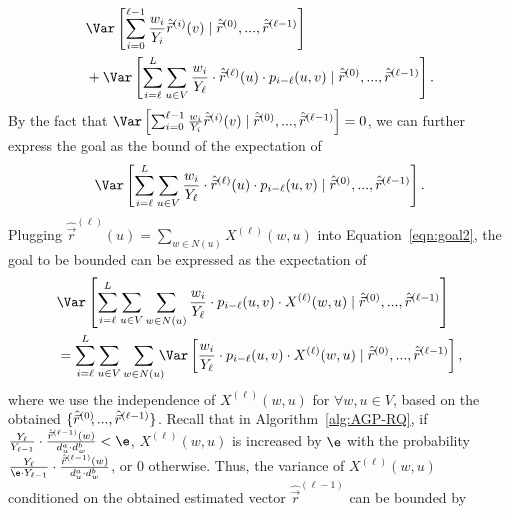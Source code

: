 \vspace{-2mm}
\begin{equation}\nonumber
\vspace{-2mm}
\begin{aligned}
&\Var \left[\sum_{i=0}^{\ell-1} \frac{w_i}{Y_i}\hat{\vec{r}}^{(i)}(v)\mid  \hat{\vec{r}}^{(0)},...,\hat{\vec{r}}^{(\ell-1)}\right]\\
&+\Var \left[\sum_{i=\ell}^{L}\sum_{u \in V} \frac{w_i}{Y_{\ell}}\cdot  \hat{\vec{r}}^{(\ell)}(u)\cdot  p_{i-\ell}(u,v)\mid  \hat{\vec{r}}^{(0)},...,\hat{\vec{r}}^{(\ell-1)}\right]. 
\end{aligned}
\end{equation}
By the fact that $\Var \left[ \sum_{i=0}^{\ell-1}\frac{w_i}{Y_i}\hat{\vec{r}}^{(i)}(v)\mid \hat{\vec{r}}^{(0)},...,\hat{\vec{r}}^{(\ell-1)}\right]=0$, we can further express the goal as the bound of the expectation of 
\vspace{-2mm}
\begin{equation}\label{eqn:goal2}
\vspace{-2mm}
\Var \left[\sum_{i=\ell}^{L}\sum_{u \in V} \frac{w_i}{Y_{\ell}}\cdot  \hat{\vec{r}}^{(\ell)}(u)\cdot  p_{i-\ell}(u,v)\mid  \hat{\vec{r}}^{(0)},...,\hat{\vec{r}}^{(\ell-1)}\right]. 
\end{equation}
Plugging $\hat{\vec{r}}^{(\ell)}(u)=\sum_{w \in N(u)} X^{(\ell)}(w,u)$ into Equation~\eqref{eqn:goal2}, the goal to be bounded can be expressed as the expectation of
\vspace{-1mm}
\begin{equation}\label{eqn:goal3}
\begin{aligned}
&\Var \left[\sum_{i=\ell}^{L}\sum_{u \in V} \sum_{w \in N(u)}\frac{w_i}{Y_{\ell}}\cdot p_{i-\ell}(u,v) \cdot X^{(\ell)}(w,u)\mid  \hat{\vec{r}}^{(0)},...,\hat{\vec{r}}^{(\ell-1)}\right]\\
&=\sum_{i=\ell}^{L}\sum_{u \in V} \sum_{w \in N(u)}\hspace{-2mm}\Var \left[\frac{w_i}{Y_{\ell}}\cdot p_{i-\ell}(u,v) \cdot X^{(\ell)}(w,u)\mid  \hat{\vec{r}}^{(0)},...,\hat{\vec{r}}^{(\ell-1)}\right], 
\end{aligned}
\end{equation}
where we use the independence of $X^{(\ell)}(w,u)$ for $\forall w,u\in V$, based on the obtained $\{\hat{\vec{r}}^{(0)}\hspace{-1mm},...,\hat{\vec{r}}^{(\ell-1)}\}$. Recall that in Algorithm~\ref{alg:AGP-RQ}, if $\frac{Y_{\ell}}{Y_{\ell-1}}\cdot \frac{\hat{\vec{r}}^{(\ell-1)}(w)}{d_u^a\cdot d_w^b}< \e$, $X^{(\ell)}(w,u)$ is increased by $\e$ with the probability $\frac{Y_{\ell}}{\e \cdot Y_{\ell-1}}\cdot \frac{\hat{\vec{r}}^{(\ell-1)}(w)}{d_u^a\cdot d_w^b}$, or $0$ otherwise. Thus, the variance of $X^{(\ell)}(w,u)$ conditioned on the obtained estimated vector $\hat{\vec{r}}^{(\ell-1)}$ can be bounded by
